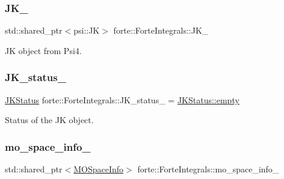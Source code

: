 \subsubsection{\texorpdfstring{J\+K\+\_\+}{JK\_}}
{\footnotesize\ttfamily std\+::shared\+\_\+ptr$<$psi\+::\+JK$>$ forte\+::\+Forte\+Integrals\+::\+J\+K\+\_\+\hspace{0.3cm}{\ttfamily [protected]}}



JK object from Psi4. 

\mbox{\label{classforte_1_1_forte_integrals_a9084872d37bee552673bb1d574527ba2}} 
\subsubsection{\texorpdfstring{J\+K\+\_\+status\+\_\+}{JK\_status\_}}
{\footnotesize\ttfamily \mbox{\hyperlink{classforte_1_1_forte_integrals_a5ef066e57ff1494e90669779b1d0ecc2}{J\+K\+Status}} forte\+::\+Forte\+Integrals\+::\+J\+K\+\_\+status\+\_\+ = \mbox{\hyperlink{classforte_1_1_forte_integrals_a5ef066e57ff1494e90669779b1d0ecc2aa2e4822a98337283e39f7b60acf85ec9}{J\+K\+Status\+::empty}}\hspace{0.3cm}{\ttfamily [protected]}}



Status of the JK object. 

\mbox{\label{classforte_1_1_forte_integrals_a3dce6aa1e684a583f2cd947450f4b6f6}} 
\subsubsection{\texorpdfstring{mo\+\_\+space\+\_\+info\+\_\+}{mo\_space\_info\_}}
{\footnotesize\ttfamily std\+::shared\+\_\+ptr$<$\mbox{\hyperlink{classforte_1_1_m_o_space_info}{M\+O\+Space\+Info}}$>$ forte\+::\+Forte\+Integrals\+::mo\+\_\+space\+\_\+info\+\_\+\hspace{0.3cm}{\ttfamily [protected]}}



